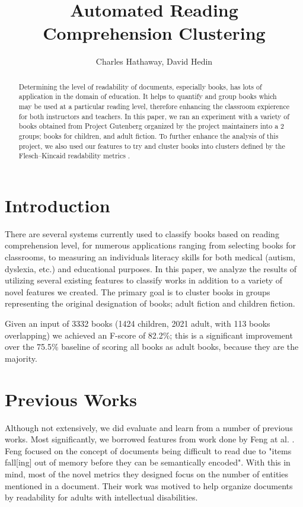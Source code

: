 \documentclass[]{article}
\title{Automated Reading Comprehension Clustering}
\author{Charles Hathaway, David Hedin}
\begin{document}
\maketitle

\begin{abstract}

Determining the level of readability of documents, especially books, has lots of application in the domain of education.
It helps to quantify and group books which may be used at a particular reading level, therefore enhancing the classroom expierence for both instructors and teachers.
In this paper, we ran an experiment with a variety of books obtained from Project Gutenberg \cite{gutenberg2015} organized by the project maintainers into a 2 groups; books for children, and adult fiction.
To further enhance the analysis of this project, we also used our features to try and cluster books into clusters defined by the Flesch–Kincaid readability metrics \cite{kincaid1975derivation}.

\end{abstract}

\section{Introduction}

There are several systems currently used to classify books based on reading comprehension level, for numerous applications ranging from selecting books for classrooms, to measuring an individuals literacy skills for both medical (autism, dyslexia, etc.) and educational purposes.
In this paper, we analyze the results of utilizing several existing features to classify works in addition to a variety of novel features we created.
The primary goal is to cluster books in groups representing the original designation of books; adult fiction and children fiction.

Given an input of 3332 books (1424 children, 2021 adult, with 113 books overlapping) we achieved an F-score of 82.2\%; this is a significant improvement over the 75.5\% baseline of scoring all books as adult books, because they are the majority.

\section{Previous Works}

Although not extensively, we did evaluate and learn from a number of previous works.
Most significantly, we borrowed features from work done by Feng at al. \cite{feng2009cognitively}.
Feng focused on the concept of documents being difficult to read due to "items fall[ing] out of memory before they can be semantically encoded".
With this in mind, most of the novel metrics they designed focus on the number of entities mentioned in a document.
Their work was motived to help organize documents by readability for adults with intellectual disabilities.
\end{document}
